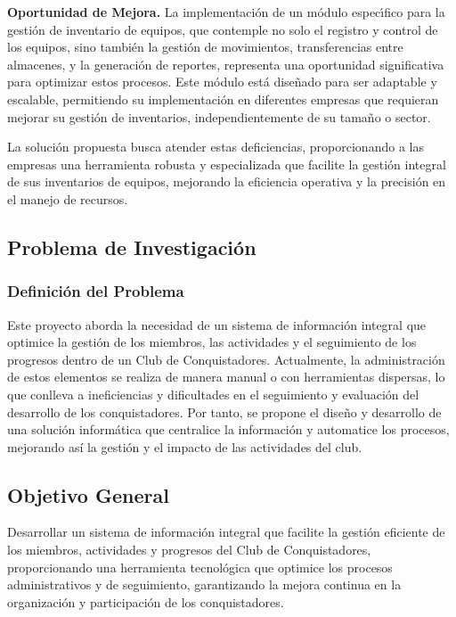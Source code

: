 \documentclass[stu, 12pt, letterpaper, donotrepeattitle, floatsintext, natbib]{apa7}
\begin{document}
\textbf{Oportunidad de Mejora. }La implementaci\'on de un m\'odulo espec\'{\i}fico para la gesti\'on de inventario de equipos, que contemple no solo el registro y control de los equipos, sino tambi\'en la gesti\'on de
movimientos, transferencias entre almacenes, y la generaci\'on de reportes, representa una oportunidad significativa para optimizar estos procesos. Este m\'odulo est\'a dise\~{n}ado para ser adaptable y escalable, permitiendo
su implementaci\'on en diferentes empresas que requieran mejorar su gesti\'on de inventarios, independientemente de su tama\~{n}o o sector.

La soluci\'on propuesta busca atender estas deficiencias, proporcionando a las empresas una herramienta robusta y especializada que facilite la gesti\'on integral de sus inventarios de equipos, mejorando la eficiencia
operativa y la precisi\'on en el manejo de recursos.
\subsection{Problema de Investigaci\'on}

\subsubsection{Definici\'on del Problema}
Este proyecto aborda la necesidad de un sistema de informaci\'on integral que
optimice la gesti\'on de los miembros, las actividades y el seguimiento de los
progresos dentro de un Club de Conquistadores. Actualmente, la administraci\'on
de estos elementos se realiza de manera manual o con herramientas dispersas, lo
que conlleva a ineficiencias y dificultades en el seguimiento y evaluaci\'on
del desarrollo de los conquistadores. Por tanto, se propone el dise\~{n}o y
desarrollo de una soluci\'on inform\'atica que centralice la informaci\'on y
automatice los procesos, mejorando as\'i la gesti\'on y el impacto de las
actividades del club.

\subsection{Objetivo General}
Desarrollar un sistema de informaci\'on integral que facilite la gesti\'on
eficiente de los miembros, actividades y progresos del Club de Conquistadores,
proporcionando una herramienta tecnol\'ogica que optimice los procesos
administrativos y de seguimiento, garantizando la mejora continua en la
organizaci\'on y participaci\'on de los conquistadores.
\end{document}
